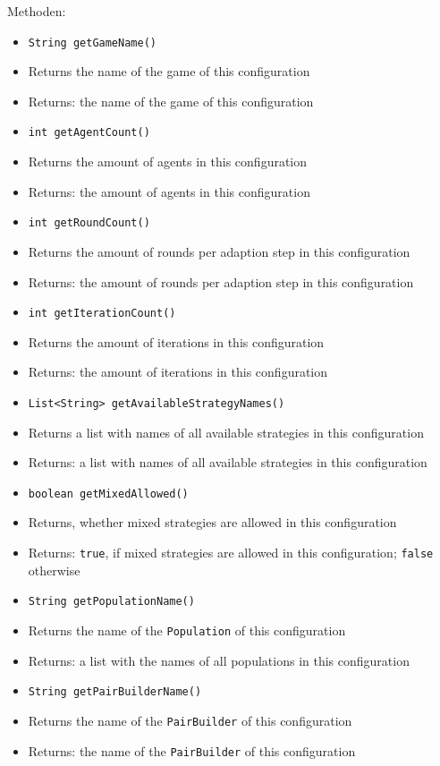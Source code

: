 \documentclass[parskip=full,11pt]{scrartcl}
\begin{document}
Methoden:
\begin{itemize}\itemsep -10pt
	\item \texttt{String getGameName()}
	\item[] Returns the name of the game of this configuration
	\item[] Returns: the name of the game of this configuration
	
	\item \texttt{int getAgentCount()}
	\item[] Returns the amount of agents in this configuration
	\item[] Returns: the amount of agents in this configuration
	
	\item \texttt{int getRoundCount()}
	\item[] Returns the amount of rounds per adaption step in this configuration
	\item[] Returns: the amount of rounds per adaption step in this configuration
	
	\item \texttt{int getIterationCount()}
	\item[] Returns the amount of iterations in this configuration
	\item[] Returns: the amount of iterations in this configuration
	
	\item \texttt{List<String> getAvailableStrategyNames()}
	\item[] Returns a list with names of all available strategies in this configuration
	\item[] Returns: a list with names of all available strategies in this configuration
	
	\item \texttt{boolean getMixedAllowed()}
	\item[] Returns, whether mixed strategies are allowed in this configuration
	\item[] Returns: \texttt{true}, if mixed strategies are allowed in this configuration; \texttt{false} otherwise
	
	\item \texttt{String getPopulationName()}
	\item[] Returns the name of the \texttt{Population} of this configuration
	\item[] Returns: a list with the names of all populations in this configuration
	
	\item \texttt{String getPairBuilderName()}
	\item[] Returns the name of the \texttt{PairBuilder} of this configuration
	\item[] Returns: the name of the \texttt{PairBuilder} of this configuration
	

\end{itemize}
\end{document}
